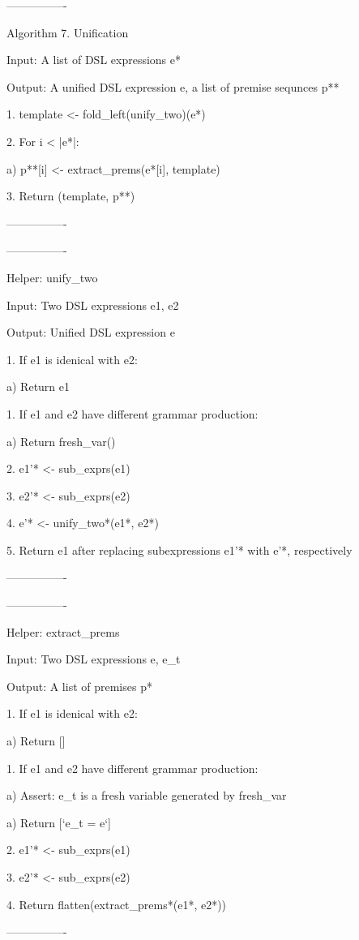 ----------------

Algorithm 7. Unification

Input: A list of DSL expressions e*

Output: A unified DSL expression e, a list of premise sequnces p**

1. template <- fold\_left(unify\_two)(e*)

2. For i < |e*|:

  a) p**[i] <- extract\_prems(e*[i], template)

3. Return (template, p**)

----------------

----------------

Helper: unify\_two

Input: Two DSL expressions e1, e2

Output: Unified DSL expression e

1. If e1 is idenical with e2:

  a) Return e1

1. If e1 and e2 have different grammar production:

  a) Return fresh\_var()

2. e1'* <- sub\_exprs(e1)

3. e2'* <- sub\_exprs(e2)

4. e'* <- unify\_two*(e1*, e2*)

5. Return e1 after replacing subexpressions e1'* with e'*, respectively

----------------

----------------

Helper: extract\_prems

Input: Two DSL expressions e, e\_t

Output: A list of premises p*

1. If e1 is idenical with e2:

  a) Return []

1. If e1 and e2 have different grammar production:

  a) Assert: e\_t is a fresh variable generated by fresh\_var

  a) Return [`e\_t = e`]

2. e1'* <- sub\_exprs(e1)

3. e2'* <- sub\_exprs(e2)

4. Return flatten(extract\_prems*(e1*, e2*))

----------------

